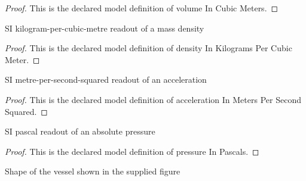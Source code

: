 \begin{proof}
  This is the declared model definition of volume In Cubic Meters.
\end{proof}
\begin{definition}
  \label{def:physics:phyx-mini-0334:phyxminiproblems-problemphyxmini0334-densityinkilogramspercubicmeter}
  SI kilogram-per-cubic-metre readout of a mass density
\end{definition}
\begin{proof}
  This is the declared model definition of density In Kilograms Per Cubic Meter.
\end{proof}
\begin{definition}
  \label{def:physics:phyx-mini-0334:phyxminiproblems-problemphyxmini0334-accelerationinmeterspersecondsquared}
  SI metre-per-second-squared readout of an acceleration
\end{definition}
\begin{proof}
  This is the declared model definition of acceleration In Meters Per Second Squared.
\end{proof}
\begin{definition}
  \label{def:physics:phyx-mini-0334:phyxminiproblems-problemphyxmini0334-pressureinpascals}
  SI pascal readout of an absolute pressure
\end{definition}
\begin{proof}
  This is the declared model definition of pressure In Pascals.
\end{proof}
\begin{definition}
  \label{def:physics:phyx-mini-0334:phyxminiproblems-problemphyxmini0334-tankshape}
  Shape of the vessel shown in the supplied figure
\end{definition}
